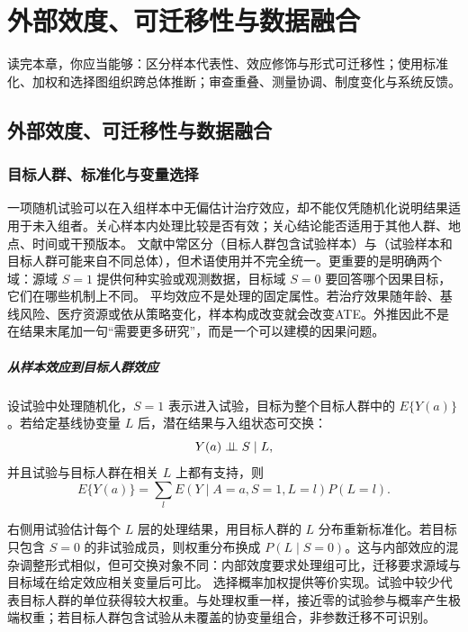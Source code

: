 \chapter{外部效度、可迁移性与数据融合}
\label{ch:transportability}

\begin{learninggoals}
读完本章，你应当能够：区分样本代表性、效应修饰与形式可迁移性；使用标准化、加权和选择图组织跨总体推断；审查重叠、测量协调、制度变化与系统反馈。
\end{learninggoals}

\section{外部效度、可迁移性与数据融合}

\subsection{目标人群、标准化与变量选择}

一项随机试验可以在入组样本中无偏估计治疗效应，却不能仅凭随机化说明结果适用于未入组者。关心样本内处理比较是否有效；关心结论能否适用于其他人群、地点、时间或干预版本。
文献中常区分（目标人群包含试验样本）与（试验样本和目标人群可能来自不同总体），但术语使用并不完全统一。更重要的是明确两个域：源域 $S=1$ 提供何种实验或观测数据，目标域 $S=0$ 要回答哪个因果目标，它们在哪些机制上不同。
平均效应不是处理的固定属性。若治疗效果随年龄、基线风险、医疗资源或依从策略变化，样本构成改变就会改变ATE。外推因此不是在结果末尾加一句“需要更多研究”，而是一个可以建模的因果问题。

\paragraph{从样本效应到目标人群效应}

设试验中处理随机化，$S=1$ 表示进入试验，目标为整个目标人群中的 $E\{Y(a)\}$。若给定基线协变量 $L$ 后，潜在结果与入组状态可交换：
\[
Y(a)\mathrel{\perp\!\!\!\perp} S\mid L,
\]
并且试验与目标人群在相关 $L$ 上都有支持，则
\[
E\{Y(a)\}=\sum_l E(Y\mid A=a,S=1,L=l)P(L=l).
\]

右侧用试验估计每个 $L$ 层的处理结果，用目标人群的 $L$ 分布重新标准化。若目标只包含 $S=0$ 的非试验成员，则权重分布换成 $P(L\mid S=0)$。这与内部效应的混杂调整形式相似，但可交换对象不同：内部效度要求处理组可比，迁移要求源域与目标域在给定效应相关变量后可比。
选择概率加权提供等价实现。试验中较少代表目标人群的单位获得较大权重。与处理权重一样，接近零的试验参与概率产生极端权重；若目标人群包含试验从未覆盖的协变量组合，非参数迁移不可识别。

